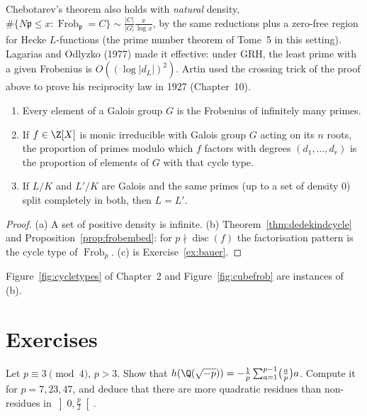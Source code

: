 \begin{remark}
Chebotarev's theorem also holds with \emph{natural} density, $\#\{N\mathfrak p\le x:\operatorname{Frob}_{\mathfrak p}=C\}\sim\frac{|C|}{|G|}\frac x
{\log x}$, by the same reductions plus a zero-free region for Hecke $L$-functions (the prime number theorem of Tome~5 in this setting). Lagarias
and Odlyzko (1977) made it effective: under GRH, the least prime with a given Frobenius is $O((\log|d_L|)^2)$. Artin used the crossing trick of
the proof above to prove his reciprocity law in 1927 (Chapter~10).
\end{remark}

\begin{corollary}\label{cor:chebcons}
\begin{enumerate}[label=(\alph*)]
\item Every element of a Galois group $G$ is the Frobenius of infinitely many primes.
\item If $f\in\Z[X]$ is monic irreducible with Galois group $G$ acting on its $n$ roots, the proportion of primes modulo which $f$ factors with
degrees $(d_1,\dots,d_r)$ is the proportion of elements of $G$ with that cycle type.
\item If $L/K$ and $L'/K$ are Galois and the same primes (up to a set of density $0$) split completely in both, then $L=L'$.
\end{enumerate}
\end{corollary}
\begin{proof}
(a) A set of positive density is infinite. (b) Theorem~\ref{thm:dedekindcycle} and Proposition~\ref{prop:frobembed}: for $p\nmid\operatorname{disc}(f)$
the factorisation pattern is the cycle type of $\operatorname{Frob}_p$. (c) is Exercise~\ref{ex:bauer}.
\end{proof}

Figure~\ref{fig:cycletypes} of Chapter~2 and Figure~\ref{fig:cubefrob} are instances of (b).

\section{Exercises}

\begin{exercise}[$\star$]\label{ex:hminusp}
Let $p\equiv3\pmod4$, $p>3$. Show that $h(\Q(\sqrt{-p}))=-\frac1p\sum_{a=1}^{p-1}\bigl(\frac ap\bigr)a$. Compute it for $p=7,23,47$, and deduce that
there are more quadratic residues than non-residues in $\left]0,\frac p2\right[$.
\end{exercise}

